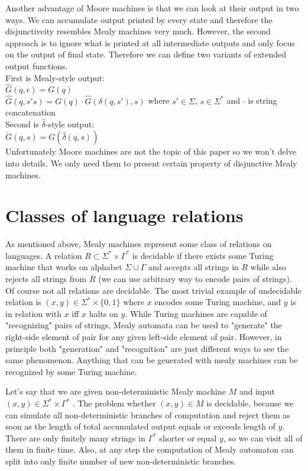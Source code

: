 \documentclass[12pt]{article}
\begin{document}
Another advantage of Moore machines is that we can look at their output in two ways. We can accumulate output printed by every state and therefore the disjunctiveity resembles Mealy machines very much. However, the second approach is to ignore what is printed at all intermediate outputs and only focus on the output of final state. Therefore we can define two variants of extended output functions. \\
First is Mealy-style output: \\
$\hat{G}(q,\epsilon) = G(q)$ \\
$\hat{G}(q,s's) = G(q)\cdot\hat{G}(\delta(q,s'),s)$ where $s' \in \Sigma$, $s\in\Sigma^*$ and $\cdot$ is string concatenation \\
Second is $\hat{\delta}$-style output: \\
$\check{G}(q,s) = G(\hat{\delta}(q,s))$\\


Unfortunately Moore machines are not the topic of this paper so we won't delve  into details. We only need them to present certain property of disjunctive Mealy machines. 


\section{Classes of language relations} As mentioned above, Mealy machines represent some class of relations on languages. A relation $R \subset \Sigma^* \times \Gamma^*$ is decidable if there exists some Turing machine that works on alphabet $\Sigma \cup \Gamma$ and accepts all strings in $R$ while also rejects all strings from $\overline{R}$ (we can use arbitrary way to encode pairs of strings). Of course not all relations are decidable. The most trivial example of undecidable relation is $(x,y)  \in \Sigma^* \times \{0,1\}$ where  $x$ encodes some Turing machine, and $y$ is in relation with $x$ iff $x$ halts on $y$. While Turing machines are capable of "recognizing" pairs of strings, Mealy automata can be used to "generate" the right-side element of pair for any given left-side element of pair. However, in principle both "generation" and "recognition" are just different ways to see the same phenomenon. Anything that can be generated with mealy machines can be recognized by some Turing machine. 

Let's say that we are given non-deterministic Mealy machine $M$ and input $(x,y) \in \Sigma^* \times \Gamma^*$ . The problem whether $(x,y) \in M$ is decidable, because we can simulate all non-deterministic branches of computation and reject them as soon as the length of total accumulated output equals or exceeds length of $y$. There are only finitely many strings in $\Gamma^*$ shorter or equal $y$, so we can visit all of them in finite time. Also, at any step the computation of Mealy automaton can split into only finite number of new non-deterministic branches. 
\end{document}
